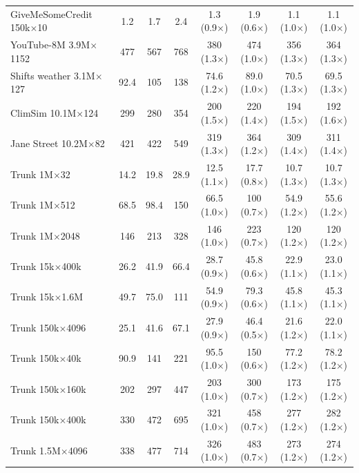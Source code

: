 \begin{table}[p]
\begin{tabular}{l|ccc|cccc}
        GiveMeSomeCredit 150k$\times$10 & 1.2 & 1.7 & 2.4 & 1.3 (0.9$\times$) & 1.9 (0.6$\times$) & 1.1 (1.0$\times$) & 1.1 (1.0$\times$) \\
        YouTube-8M 3.9M$\times$1152 & 477 & 567 & 768 & 380 (1.3$\times$) & 474 (1.0$\times$) & 356 (1.3$\times$) & 364 (1.3$\times$) \\
        Shifts weather 3.1M$\times$127 & 92.4 & 105 & 138 & 74.6 (1.2$\times$) & 89.0 (1.0$\times$) & 70.5 (1.3$\times$) & 69.5 (1.3$\times$) \\
        ClimSim 10.1M$\times$124 & 299 & 280 & 354 & 200 (1.5$\times$) & 220 (1.4$\times$) & 194 (1.5$\times$) & 192 (1.6$\times$) \\
        Jane Street 10.2M$\times$82 & 421 & 422 & 549 & 319 (1.3$\times$) & 364 (1.2$\times$) & 309 (1.4$\times$) & 311 (1.4$\times$) \\
        Trunk 1M$\times$32 & 14.2 & 19.8 & 28.9 & 12.5 (1.1$\times$) & 17.7 (0.8$\times$) & 10.7 (1.3$\times$) & 10.7 (1.3$\times$) \\
        Trunk 1M$\times$512 & 68.5 & 98.4 & 150 & 66.5 (1.0$\times$) & 100 (0.7$\times$) & 54.9 (1.2$\times$) & 55.6 (1.2$\times$) \\
        Trunk 1M$\times$2048 & 146 & 213 & 328 & 146 (1.0$\times$) & 223 (0.7$\times$) & 120 (1.2$\times$) & 120 (1.2$\times$) \\
        Trunk 15k$\times$400k & 26.2 & 41.9 & 66.4 & 28.7 (0.9$\times$) & 45.8 (0.6$\times$) & 22.9 (1.1$\times$) & 23.0 (1.1$\times$) \\
        Trunk 15k$\times$1.6M & 49.7 & 75.0 & 111 & 54.9 (0.9$\times$) & 79.3 (0.6$\times$) & 45.8 (1.1$\times$) & 45.3 (1.1$\times$) \\
        Trunk 150k$\times$4096 & 25.1 & 41.6 & 67.1 & 27.9 (0.9$\times$) & 46.4 (0.5$\times$) & 21.6 (1.2$\times$) & 22.0 (1.1$\times$) \\
        Trunk 150k$\times$40k & 90.9 & 141 & 221 & 95.5 (1.0$\times$) & 150 (0.6$\times$) & 77.2 (1.2$\times$) & 78.2 (1.2$\times$) \\
        Trunk 150k$\times$160k & 202 & 297 & 447 & 203 (1.0$\times$) & 300 (0.7$\times$) & 173 (1.2$\times$) & 175 (1.2$\times$) \\
        Trunk 150k$\times$400k & 330 & 472 & 695 & 321 (1.0$\times$) & 458 (0.7$\times$) & 277 (1.2$\times$) & 282 (1.2$\times$) \\
        Trunk 1.5M$\times$4096 & 338 & 477 & 714 & 326 (1.0$\times$) & 483 (0.7$\times$) & 273 (1.2$\times$) & 274 (1.2$\times$) \\

\end{tabular}
\end{table}
